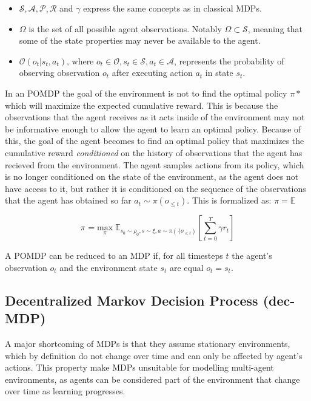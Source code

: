 \documentclass{../main.tex}{subfile}
\begin{document}
\begin{itemize}
    \item $\mathcal{S}, \mathcal{A}, \mathcal{P}, \mathcal{R}$ and $\gamma$ express the same concepts as in classical MDPs.
    \item $\Omega$ is the set of all possible agent observations. Notably $\Omega \subset \mathcal{S}$, meaning that some of the state properties may never be available to the agent.
    \item $\mathcal{O}(o_t | s_t, a_t)$, where $o_t \in \mathcal{O}, s_t \in \mathcal{S}, a_t \in \mathcal{A}$, represents the probability of observing observation $o_t$ after executing action $a_t$ in state $s_t$. 
\end{itemize}

        In an POMDP the goal of the environment is not to find the optimal policy $\pi*$ which will maximize the expected cumulative reward. This is because the observations that the agent receives as it acts inside of the environment may not be informative enough to allow the agent to learn an optimal policy. Because of this, the goal of the agent becomes to find an optimal policy that maximizes the cumulative reward \textit{conditioned} on the history of observations that the agent has recieved from the environment. The agent samples actions from its policy, which is no longer conditioned on the state of the environment, as the agent does not have access to it, but rather it is conditioned on the sequence of the observations that the agent has obtained so far $a_t \sim \pi(o_{\leq t})$. This is formalized as: $\pi = \mathbb{E}$

        \begin{equation}
        \pi^{} = \underset{\pi}{\text{max}}\;  \mathbb{E}_{s_0 \sim \rho_0, s \sim \xi, a \sim \pi(\cdot | o_{\leq t})}[\sum_{t=0}^{T} \gamma r_t]
        \end{equation}

A POMDP can be reduced to an MDP if, for all timesteps $t$ the agent's observation $o_t$ and the environment state $s_t$ are equal $o_t = s_t$.

\subsection{Decentralized Markov Decision Process (dec-MDP)}

A major shortcoming of MDPs is that they assume stationary environments, which by definition do not change over time and can only be affected by agent's actions. This property make MDPs unsuitable for modelling multi-agent environments, as agents can be considered part of the environment that change over time as learning progresses.
\end{document}
